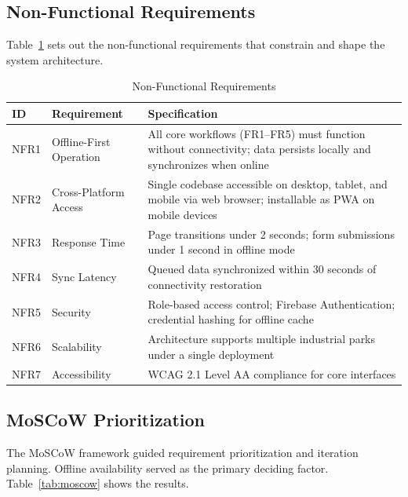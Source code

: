 \subsection{Non-Functional Requirements}

Table~\ref{tab:nonfunc-req} sets out the non-functional requirements that constrain and shape the system architecture.

\begin{table}[H]
\centering
\caption{Non-Functional Requirements}
\label{tab:nonfunc-req}
\small
\begin{tabular}{lp{3cm}p{8cm}}
\toprule
\textbf{ID} & \textbf{Requirement} & \textbf{Specification} \\
\midrule
NFR1 & Offline-First Operation & All core workflows (FR1--FR5) must function without connectivity; data persists locally and synchronizes when online \\
NFR2 & Cross-Platform Access & Single codebase accessible on desktop, tablet, and mobile via web browser; installable as PWA on mobile devices \\
NFR3 & Response Time & Page transitions under 2 seconds; form submissions under 1 second in offline mode \\
NFR4 & Sync Latency & Queued data synchronized within 30 seconds of connectivity restoration \\
NFR5 & Security & Role-based access control; Firebase Authentication; credential hashing for offline cache \\
NFR6 & Scalability & Architecture supports multiple industrial parks under a single deployment \\
NFR7 & Accessibility & WCAG 2.1 Level AA compliance for core interfaces \\
\bottomrule
\end{tabular}
\end{table}

\subsection{MoSCoW Prioritization}

The MoSCoW framework guided requirement prioritization and iteration planning. Offline availability served as the primary deciding factor. Table~\ref{tab:moscow} shows the results.

